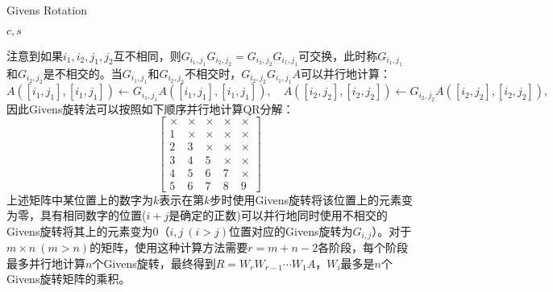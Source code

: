 \documentclass[a4paper,10pt]{ctexart}
\begin{document}
\begin{algorithm}[htbp]
    \caption{Givens Rotation}\label{alg:Givens}
    \Return $ c,s $\;
\end{algorithm}

注意到如果$ i_1, i_2,j_1,j_2 $互不相同，则$ G_{i_1,j_1}G_{i_2,j_2} = G_{i_2,j_2}G_{i_1,j_1} $可交换，此时称$ G_{i_1,j_1} $和$ G_{i_2,j_2} $是不相交的。当$ G_{i_1,j_1} $和$ G_{i_2,j_2} $不相交时，$ G_{i_2,j_2}G_{i_1,j_1}A $可以并行地计算：
\[
    A([i_1,j_1],[i_1,j_1]) \leftarrow G_{i_1,j_1}A([i_1,j_1],[i_1,j_1]),\quad A([i_2,j_2],[i_2,j_2]) \leftarrow G_{i_2,j_2}A([i_2,j_2],[i_2,j_2]),
\]
因此Givens旋转法可以按照如下顺序并行地计算QR分解：
\[
    \begin{bmatrix} 
        \times & \times & \times & \times & \times\\
        1 & \times & \times & \times & \times\\
        2 & 3 & \times & \times & \times\\
        3 & 4 & 5 & \times & \times\\
        4 & 5 & 6 & 7 & \times\\
        5 & 6 & 7 & 8 & 9
    \end{bmatrix} 
\]
上述矩阵中某位置上的数字为$ k $表示在第$ k $步时使用Givens旋转将该位置上的元素变为零，具有相同数字的位置($ i+j $是确定的正数)可以并行地同时使用不相交的Givens旋转将其上的元素变为0（$ i,j\ (i>j)$位置对应的Givens旋转为$ G_{i,j} $）。对于$ m\times n\ (m>n) $的矩阵，使用这种计算方法需要$ r=m+n-2 $各阶段，每个阶段最多并行地计算$ n $个Givens旋转，最终得到$ R = W_rW_{r-1}\cdots W_1 A $，$ W_i $最多是$ n $个Givens旋转矩阵的乘积。
\end{document}
